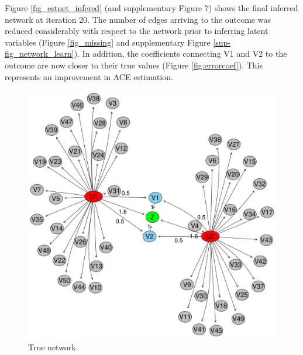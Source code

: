 \documentclass[letterpaper]{article}
\begin{document}
Figure \ref{fig_estnet_infered}  (and supplementary Figure 7) shows the final inferred network at iteration 20. The number of edges arriving to the outcome was reduced considerably with respect to the network prior to inferring latent variables (Figure \ref{fig_missing} and supplementary Figure \ref{sup-fig_network_learn}). In addition, the coefficients connecting V1 and V2 to the outcome are now closer to their true values (Figure \ref{fig:errorcoef}). This represents an improvement in ACE estimation.

\begin{figure}[ht!]
  \centering
  \begin{minipage}[t]{0.29\linewidth}
    \includegraphics[width=\linewidth]{./images/true_network.pdf}
    \caption{\label{fig_truenet}True network. }
  \end{minipage}\hfill
   \begin{minipage}[t]{0.33\linewidth}

\end{minipage}
\end{figure}
\end{document}
